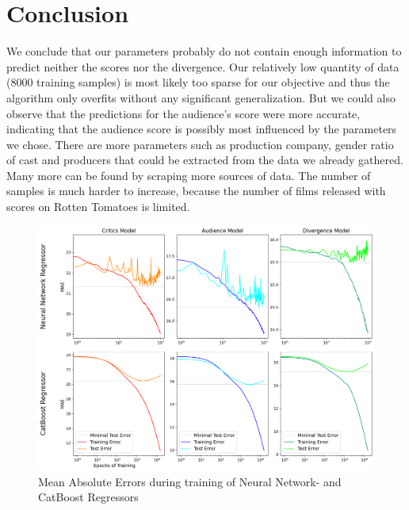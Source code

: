 \documentclass{article}
\begin{document}
    \section{Conclusion}
    We conclude that our parameters probably do not contain enough information to predict neither the scores nor the divergence. Our relatively low quantity of data (8000 training samples) is most likely too sparse for our objective and thus the algorithm only overfits without any significant generalization. But we could also observe that the predictions for the audience's score were more accurate, indicating that the audience score is possibly most influenced by the parameters we chose. There are more parameters such as production company, gender ratio of cast and producers that could be extracted from the data we already gathered. Many more can be found by scraping more sources of data. The number of samples is much harder to increase, because the number of films released with scores on Rotten Tomatoes is limited.
    \begin{figure}[tb]
        \centering
        \includegraphics[width=1\textwidth]{imgs/regression_errors.png}
        \caption{Mean Absolute Errors during training of Neural Network- and CatBoost Regressors}
        \label{fig:mae_errors}
    \end{figure}

\clearpage


\end{document}
